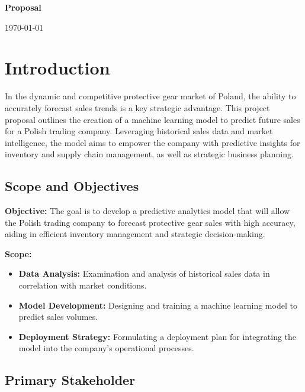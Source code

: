 \documentclass{article}
\begin{document}
\begin{titlepage}
    \centering
    \vspace*{4cm}
    {\Huge\bfseries Proposal \par}
    \vspace{2cm}
    {\huge \par}
    \vfill
    \vspace{2cm}
    {\large \today\par}
\end{titlepage}

\newpage
\tableofcontents
\newpage    

\section{Introduction}

In the dynamic and competitive protective gear market of Poland, the ability to accurately forecast sales trends is a key strategic advantage. This project proposal outlines the creation of a machine learning model to predict future sales for a Polish trading company. Leveraging historical sales data and market intelligence, the model aims to empower the company with predictive insights for inventory and supply chain management, as well as strategic business planning.

\subsection{Scope and Objectives}

\textbf{Objective:} The goal is to develop a predictive analytics model that will allow the Polish trading company to forecast protective gear sales with high accuracy, aiding in efficient inventory management and strategic decision-making.

\textbf{Scope:}

\begin{itemize}
  \item \textbf{Data Analysis:} Examination and analysis of historical sales data in correlation with market conditions.
  \item \textbf{Model Development:} Designing and training a machine learning model to predict sales volumes.
  \item \textbf{Deployment Strategy:} Formulating a deployment plan for integrating the model into the company's operational processes.
\end{itemize}

\subsection{Primary Stakeholder}
\end{document}
